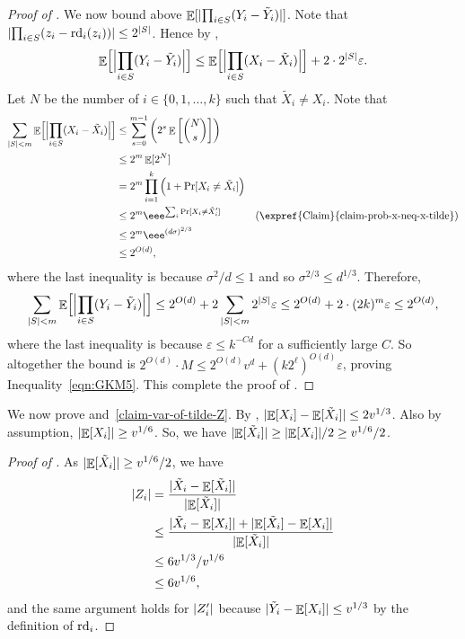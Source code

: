 \documentclass{toc}
\def\eps{\varepsilon}
\def\rd{\textnormal{rd}}
\DeclarePairedDelimiter{\abs}{\lvert}{\rvert}
\DeclareMathOperator*{\E}{\mathbb{E}}                 %
\begin{document}
\begin{proof}[Proof of {}]
    We now bound above $\E[\abs{\prod_{i \in S} (Y_i - \tilde Y_i)}]$.
    Note that $\abs{ \prod_{i \in S} (z_i - \rd_i(z_i)) } \le 2^{\abs{S}}$.
    Hence by ,
    \[
      \E \Bigl[ \Bigl| \prod_{i \in S} ( Y_i - \tilde Y_i ) \Bigr| \Bigr]
      \le \E \Bigl[ \Bigl| \prod_{i \in S} ( X_i - \tilde X_i ) \Bigr| \Bigr] + 2 \cdot 2^{\abs{S}} \eps .
    \]
    Let $N$ be the number of $i \in \{0, 1, \ldots, k\}$ such that $\tilde X_i \neq X_i$.
    Note that
    \begin{align*}
      \sum_{ \abs{S} < m} \E \Bigl[ \Bigl| \prod_{i \in S} ( X_i - \tilde X_i ) \Bigr| \Bigr]
      &\le \sum_{s = 0}^{m-1} \left( 2^s \E\left[ {N \choose s} \right] \right) \\
      &\le 2^m \E[2^N] \\
      &= 2^m \prod_{i = 1}^k \Big( 1 + \Pr[X_i \neq \tilde X_i] \Big) \\
      &\le 2^m \eee^{ \sum_i \Pr[X_i \neq \tilde X_i'] } & \text{(\expref{Claim}{claim-prob-x-neq-x-tilde})} \\
      &\le 2^m \eee^{ (d \sigma)^{2/3} } \\
      &\le 2^{O(d)} ,
    \end{align*}
    where the last inequality is because $\sigma^2/d \le 1$ and so $\sigma^{2/3} \le d^{1/3}$.
    Therefore,
    \[
      \sum_{ \abs{S} < m} \E \Bigl[ \Bigl| \prod_{i \in S} ( Y_i - \tilde Y_i ) \Bigr| \Bigr]
      \le 2^{O(d)} + 2 \sum_{\abs{S} < m} 2^{\abs{S}} \eps
      \le 2^{O(d)} + 2 \cdot (2k)^m \eps
      \le 2^{O(d)} ,
    \]
    where the last inequality is because $\eps \le k^{-Cd}$ for a sufficiently large $C$.
    So altogether the bound is $2^{O(d)} \cdot M \le 2^{O(d)} v^d + (k 2^\ell)^{O(d)} \eps$, proving Inequality~\eqref{eqn:GKM5}.
    This complete the proof of .
  \end{proof}

  We now prove  and~\ref{claim-var-of-tilde-Z}.
  By , $\abs{ \E[X_i] - \E[\tilde X_i] } \le 2 v^{1/3}$.
  Also by assumption, $\abs{\E[X_i]} \ge v^{1/6}$.
  So, we have $\abs{\E[\tilde X_i]} \ge \abs{\E[X_i]}/2 \ge v^{1/6}/2$.

  \begin{proof}[Proof of {}]
    As $\abs{\E[\tilde X_i]} \ge v^{1/6} / 2$, we have
    \begin{align*}
      \abs{Z_i}
      &= \frac{ \abs{ \tilde X_i - \E[\tilde X_i] } }{ \abs{\E[\tilde X_i]} } \\
      &\le \frac{ \abs{ \tilde X_i - \E[X_i]} + \abs{\E[\tilde X_i] - \E[X_i]} }{ \abs{\E[\tilde X_i]} } \\
      &\le 6 v^{1/3} / v^{1/6} \\
      &\le 6 v^{1/6} ,
    \end{align*}
    and the same argument holds for $\abs{Z_i'}$ because $\abs{\tilde Y_i - \E[X_i]} \le v^{1/3}$ by the definition of $\rd_i$.
  \end{proof}
\end{document}
